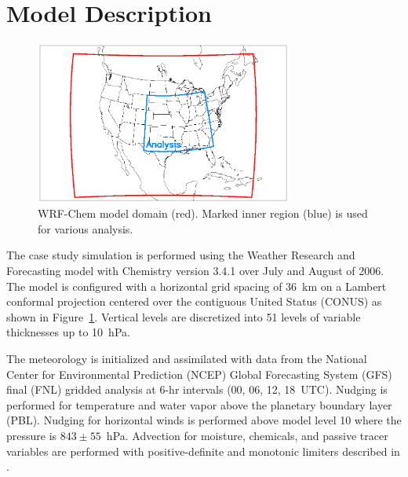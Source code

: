 \section{Model Description}\label{sect:setup}

 \begin{figure}
 \noindent\includegraphics[width=20pc]{figures/domain.eps} %
 \caption{WRF-Chem model domain (red). Marked inner region (blue) is used for various analysis.}
 \label{fig:domain}
 \end{figure}

The case study simulation is performed using the Weather Research and Forecasting model
\citep{Skamarock:2008xx} with Chemistry \citep[WRF-Chem;][]{Grell:2005fv} version 3.4.1
over July and August of 2006. The model is configured with a horizontal grid spacing of 36~km
on a Lambert conformal projection centered over the contiguous United Status (CONUS) as
shown in Figure~\ref{fig:domain}. Vertical levels are discretized into 51 levels of variable thicknesses
up to 10~hPa.

The meteorology is initialized and assimilated with data from the National Center for Environmental
Prediction (NCEP) Global Forecasting System (GFS) final (FNL) gridded analysis at 6-hr intervals
(00, 06, 12, 18~UTC). Nudging is performed for temperature and water vapor above the planetary
boundary layer (PBL). Nudging for horizontal winds is performed above model level 10 where the
pressure is $843\pm55$~hPa. Advection for moisture, chemicals, and passive tracer
variables are performed with positive-definite and monotonic limiters described in
\citet{Skamarock:2006wm, Wang:2009fk}.

